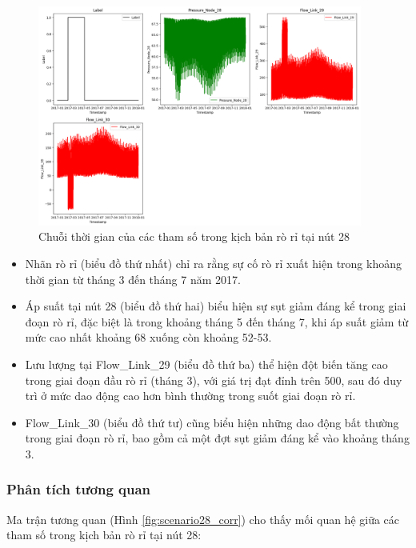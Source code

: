 \begin{figure}[H]
    \centering
    \includegraphics[width=0.95\textwidth]{image/section5_1/scenario28_timeseries.png}
    \caption{Chuỗi thời gian của các tham số trong kịch bản rò rỉ tại nút 28}
    \label{fig:scenario28_timeseries}
\end{figure}

\begin{itemize}
    \item Nhãn rò rỉ (biểu đồ thứ nhất) chỉ ra rằng sự cố rò rỉ xuất hiện trong khoảng thời gian từ tháng 3 đến tháng 7 năm 2017.
    \item Áp suất tại nút 28 (biểu đồ thứ hai) biểu hiện sự sụt giảm đáng kể trong giai đoạn rò rỉ, đặc biệt là trong khoảng tháng 5 đến tháng 7, khi áp suất giảm từ mức cao nhất khoảng 68 xuống còn khoảng 52-53.
    \item Lưu lượng tại Flow\_Link\_29 (biểu đồ thứ ba) thể hiện đột biến tăng cao trong giai đoạn đầu rò rỉ (tháng 3), với giá trị đạt đỉnh trên 500, sau đó duy trì ở mức dao động cao hơn bình thường trong suốt giai đoạn rò rỉ.
    \item Flow\_Link\_30 (biểu đồ thứ tư) cũng biểu hiện những dao động bất thường trong giai đoạn rò rỉ, bao gồm cả một đợt sụt giảm đáng kể vào khoảng tháng 3.
\end{itemize}

\subsubsection{Phân tích tương quan}

Ma trận tương quan (Hình \ref{fig:scenario28_corr}) cho thấy mối quan hệ giữa các tham số trong kịch bản rò rỉ tại nút 28:

